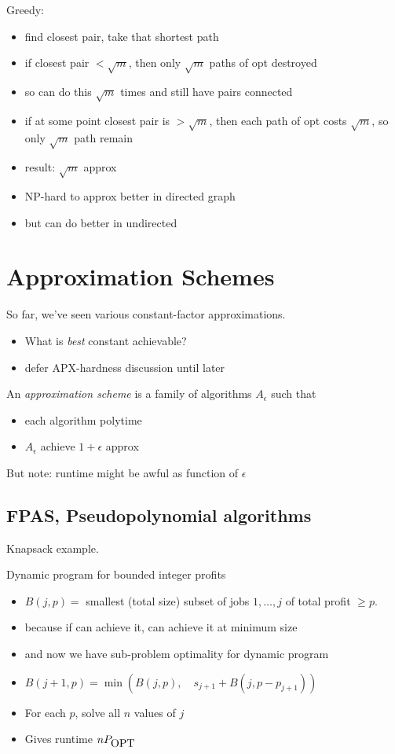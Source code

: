 \documentclass{article}
\begin{document}
Greedy:
\begin{itemize}
\item find closest pair, take that shortest path
\item if closest pair $<  \sqrt{m}$, then only $\sqrt{m}$ paths of opt
  destroyed
\item so can do this $\sqrt{m}$ times and still have pairs connected
\item if at some point closest pair is $>\sqrt{m}$, then each path of
  opt costs $\sqrt{m}$, so only $\sqrt{m}$ path remain
\item result: $\sqrt{m}$ approx
\item NP-hard to approx better in directed graph
\item but can do better in undirected
\end{itemize}
\fi

\section*{Approximation Schemes}

So far, we've seen various constant-factor approximations.
\begin{itemize}
\item What is \emph{best} constant achievable?
\item defer APX-hardness discussion until later
\end{itemize}

An \emph{approximation scheme} is a family of algorithms $A_\epsilon$
such that
\begin{itemize}
\item each algorithm polytime
\item $A_\epsilon$ achieve $1+\epsilon$ approx
\end{itemize}

But note: runtime might be awful as function of $\epsilon$



\subsection*{FPAS, Pseudopolynomial algorithms}

Knapsack example.

Dynamic program for bounded integer profits
\begin{itemize}
\item $B(j,p)=$ smallest (total size) subset of jobs $1,\ldots,j$ of
  total profit $\ge p$.
\item because if can achieve it, can achieve it at minimum size
\item and now we have sub-problem optimality for dynamic program
\item $B(j+1,p) = \min \left( B(j,p),\quad s_{j+1}+B(j,p-p_{j+1}) \right)$
\item For each $p$, solve all $n$ values of $j$
\item Gives runtime $nP_{{\mbox{OPT}}}$
\end{itemize}
\end{document}
